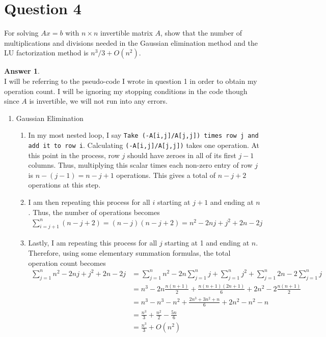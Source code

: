 \documentclass[10pt,a4paper]{article}
\theoremstyle{definition}
\newtheorem*{answer*}{Answer}
\theoremstyle{definition}
\numberwithin{equation}{section}
\begin{document}
\section*{Question 4}
For solving $Ax = b$ with $n \times n$ invertible matrix $A$, show that the number of multiplications and divisions needed in the Gaussian elimination method and the LU factorization
method is $n^3/3 + O(n^2)$.

\begin{answer*}$ $
\\I will be referring to the pseudo-code I wrote in question 1 in order to obtain my operation count. I will be ignoring my stopping conditions in the code though since $A$ is invertible, we will not run into any errors.  
\begin{enumerate}[label = $\bullet$]
\item Gaussian Elimination
	\begin{enumerate}[label = $\circ$]
	\item In my most nested loop, I say \verb!Take (-A[i,j]/A[j,j]) times row j and add it to row i!. Calculating \verb!(-A[i,j]/A[j,j])! takes one operation. At this point in the process, row $j$ should have zeroes in all of its first $j - 1$ columns. Thus, multiplying this scalar times each non-zero entry of row $j$ is $n - (j - 1) = n - j + 1$ operations. This gives a total of $n - j + 2$ operations at this step. 
	\item I am then repeating this process for all $i$ starting at $j + 1$ and ending at $n$. Thus, the number of operations becomes
	\begin{align*}
	\sum_{i = j + 1}^n (n - j + 2) = (n - j)(n - j + 2) = n^2 - 2nj + j^2 + 2n - 2j
	\end{align*}
	\item Lastly, I am repeating this process for all $j$ starting at 1 and ending at $n$. Therefore, using some elementary summation formulas, the total operation count becomes
	\begin{align*}
	\sum_{j = 1}^n n^2 - 2nj + j^2 + 2n - 2j &= \sum_{j = 1}^n n^2 - 2n \sum_{j = 1}^n j + \sum_{j = 1}^n j^2 + \sum_{j = 1}^n 2n - 2 \sum_{j = 1}^n j\\
	&= n^3 - 2n \frac{n(n + 1)}{2} + \frac{n(n + 1)(2n + 1)}{6} + 2n^2 - 2 \frac{n(n+1)}{2}\\
	&= n^3 - n^3 - n^2 + \frac{2n^3 + 3n^2 + n}{6} + 2n^2 - n^2 - n\\
	&= \frac{n^3}{3} + \frac{n^2}{2} - \frac{5n}{6}\\
	&= \frac{n^3}{3} + O(n^2)

\end{align*}
\end{enumerate}
\end{enumerate}
\end{answer*}
\end{document}
